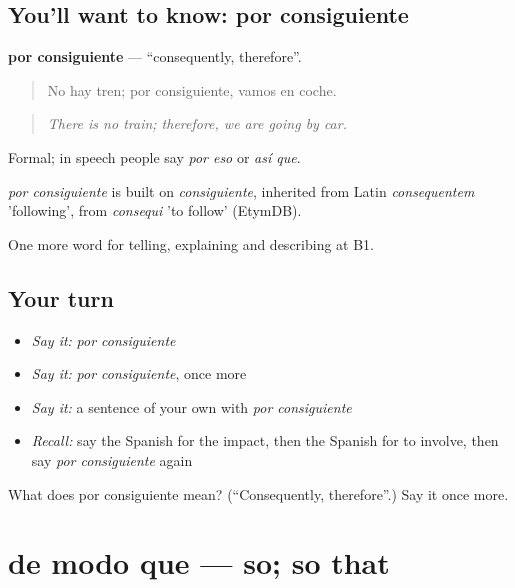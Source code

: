 \subsection*{You'll want to know: por consiguiente}
\textbf{por consiguiente} — \textquotedblleft{}consequently, therefore\textquotedblright{}.

\begin{quote}
No hay tren; por consiguiente, vamos en coche.
\end{quote}

\begin{quote}
\emph{There is no train; therefore, we are going by car.}
\end{quote}

Formal; in speech people say \emph{por eso} or \emph{así que}.

\begin{cousinweb}
\emph{por consiguiente} is built on \emph{consiguiente}, inherited from Latin \emph{consequentem} 'following', from \emph{consequi} 'to follow' (EtymDB).
\end{cousinweb}

\begin{grammarlens}[title={What you've built}]
One more word for telling, explaining and describing at B1.
\end{grammarlens}

\subsection*{Your turn}
\begin{itemize}
\raggedright
  \item \emph{Say it:} \emph{por consiguiente}
  \item \emph{Say it:} \emph{por consiguiente}, once more
  \item \emph{Say it:} a sentence of your own with \emph{por consiguiente}
  \item \emph{Recall:} say the Spanish for the impact, then the Spanish for to involve, then say \emph{por consiguiente} again
\end{itemize}

\begin{tcolorbox}[breakable,colback=teal!4,colframe=teal!35!black,title={Before you move on}]
What does por consiguiente mean? (\textquotedblleft{}Consequently, therefore\textquotedblright{}.) Say it once more.
\end{tcolorbox}
\section[de modo que]{de modo que — so; so that}

